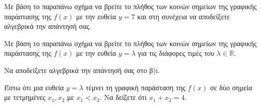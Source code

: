 \begin{alist}
\item Με βάση το παραπάνω σχήμα να βρείτε το πλήθος των κοινών σημείων της γραφικής παράστασης της $f(x)$ με την ευθεία $y = 7$ και στη συνέχεια να αποδείξετε αλγεβρικά την απάντησή σας.

\item
\begin{rlist}
\item Με βάση το παραπάνω σχήμα να βρείτε το πλήθος των κοινών σημείων της γραφικής παράστασης της $f(x)$ με την ευθεία $y = \lambda$ για τις διάφορες τιμές του $\lambda \in \mathbb{R}$.
\item Να αποδείξετε αλγεβρικά την απάντησή σας στο β)i.
\end{rlist}
\item Έστω ότι μια ευθεία $y = \lambda$ τέμνει τη γραφική παράσταση της $f(x)$ σε δύο σημεία με τετμημένες $x_1, x_2$ με $x_1 < x_2$. Να δείξετε ότι $x_1 + x_2 = 4$.
\end{alist}

